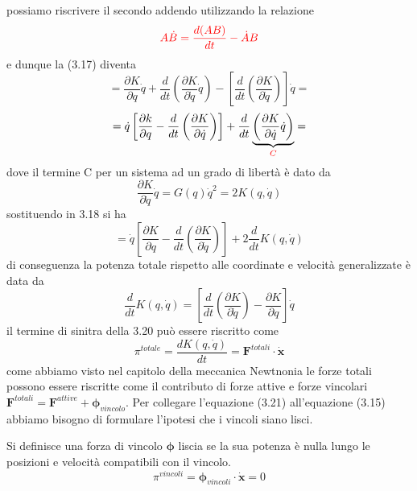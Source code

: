 possiamo riscrivere il secondo addendo utilizzando la relazione
\begin{equation*}
	\textcolor{red}{A\dot{B} = \frac{d(AB)}{dt} - \dot{A}B} 
\end{equation*}
e dunque la (3.17) diventa 
\begin{equation*}
=\frac{\partial K}{\partial q} \dot{q}+\frac{d}{d t}\left(\frac{\partial K}{\partial \dot{q}} \dot{q}\right)-\left[\frac{d}{d t}\left(\frac{\partial K}{\partial \dot{q}}\right)\right] \dot{q}=
\end{equation*}
\begin{equation}
=\dot{q}\left[\frac{\partial k}{\partial q}-\frac{d}{d t}\left(\frac{\partial K}{\partial \dot{q}}\right)\right]+\frac{d}{d t} \underbrace{\left(\frac{\partial K}{\partial \dot{q}} \dot{q}\right)}_{\textcolor{red}{C}}=
\end{equation}
dove il termine C per un sistema ad un grado di libert\`{a} \`{e} dato da 
\begin{equation}
	\frac{\partial K}{\partial \dot{q}}\dot{q} = G(q)\dot{q}^2 = 2K(q,\dot{q})
\end{equation}
sostituendo in 3.18 si ha 
\begin{equation}
=\dot{q}\left[\frac{\partial K}{\partial q}-\frac{d}{d t}\left(\frac{\partial K}{\partial \dot{q}}\right)\right]+2 \frac{d}{d t} K(q, \dot{q})
\end{equation}
di conseguenza la potenza totale rispetto alle coordinate e velocit\`{a} generalizzate \`{e} data da 
\begin{equation}
\frac{d}{d t} K(q, \dot{q})=\left[\frac{d}{d t}\left(\frac{\partial K}{\partial \dot{q}}\right)-\frac{\partial K}{\partial q}\right] \dot{q}
\end{equation}
il termine di sinitra della 3.20 pu\`{o} essere riscritto come 
\begin{equation}
	\pi^{totale} = \frac{dK(q,\dot{q})}{dt} = \bm{F}^{totali} \cdot \dot{\bm{x}}
\end{equation}
come abbiamo visto nel capitolo della meccanica Newtnonia le forze totali possono essere riscritte come il contributo di forze attive e forze vincolari $\bm{F}^{totali} = \bm{F}^{attive} + \bm{\phi}_{vincolo}$.
Per collegare l'equazione (3.21) all'equazione (3.15) abbiamo bisogno di formulare l'ipotesi che i vincoli siano lisci.
\begin{definition}
	Si definisce una forza di vincolo $\bm{\phi}$ liscia se la sua potenza \`{e} nulla lungo le posizioni e velocit\`{a} compatibili con il vincolo.
\begin{equation}
	\pi^{vincoli} = \bm{\phi}_{vincoli} \cdot \bm{\dot{x}} = 0 
\end{equation}
\end{definition}
